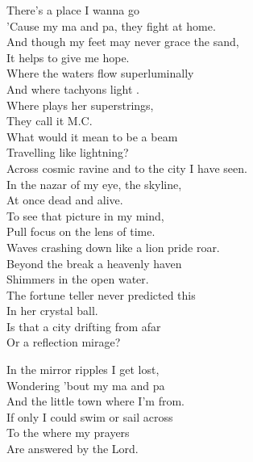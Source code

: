
\label{album:flight-b741}




There's a place I wanna go \\
'Cause my ma and pa, they fight at home. \\
And though my feet may never grace the sand, \\
It helps to give me hope. \\
Where the waters flow superluminally \\
And where tachyons light . \\
Where  plays her superstrings, \\
They call it M.C. \\

What would it mean to be a beam \\
Travelling like lightning? \\
Across cosmic ravine and to the city I have seen. \\
In the nazar of my eye, the skyline, \\
At once dead and alive. \\
To see that picture in my mind, \\
Pull focus on the lens of time. \\

Waves crashing down like a lion pride roar. \\
Beyond the break a heavenly haven \\
Shimmers in the open water. \\
The fortune teller never predicted this \\
In her crystal ball. \\
Is that a city drifting from afar \\
Or a reflection mirage? \\


In the mirror ripples I get lost, \\
Wondering 'bout my ma and pa \\
And the little town where I'm from. \\
If only I could swim or sail across \\
To the  where my prayers \\
Are answered by the Lord. \\

